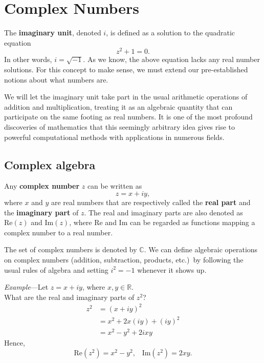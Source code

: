 \documentclass[10pt,a4paper]{article}
\begin{document}
\setcounter{page}{20}

\section{Complex Numbers}
\label{complex-numbers}

The \textbf{imaginary unit}, denoted $i$, is defined as a solution to
the quadratic equation
\begin{equation}
  z^2 + 1 = 0.
\end{equation}
In other words, $i = \sqrt{-1}$. As we know, the above equation lacks
any real number solutions. For this concept to make sense, we must
extend our pre-established notions about what numbers are.

We will let the imaginary unit take part in the usual arithmetic
operations of addition and multiplication, treating it as an algebraic
quantity that can participate on the same footing as real numbers. It is
one of the most profound discoveries of mathematics that this seemingly
arbitrary idea gives rise to powerful computational methods with
applications in numerous fields.

\subsection{Complex algebra}
\label{complex-algebra}

Any \textbf{complex number} $z$ can be written as
\begin{equation}
  z = x + i y,
\end{equation}
where $x$ and $y$ are real numbers that are respectively called the
\textbf{real part} and the \textbf{imaginary part} of $z$. The real
and imaginary parts are also denoted as $\mathrm{Re}(z)$ and
$\mathrm{Im}(z)$, where $\mathrm{Re}$ and $\mathrm{Im}$ can be
regarded as functions mapping a complex number to a real number.

The set of complex numbers is denoted by $\mathbb{C}$. We can define
algebraic operations on complex numbers (addition, subtraction,
products, etc.)~by following the usual rules of algebra and setting
$i^2 = -1$ whenever it shows up.

\begin{framed}\noindent
  \textit{Example}---Let $z = x + i y$, where $x, y \in
  \mathbb{R}$. \\ What are the real and imaginary parts of $z^2$?
  \begin{align}
    z^2 &= (x+iy)^2 \\
    &= x^2 + 2x(iy) + (iy)^2 \\
    &= x^2 - y^2 + 2ixy
  \end{align}
  Hence,
  \begin{equation}
    \mathrm{Re}(z^2) = x^2 -y^2, \;\;\; \mathrm{Im}(z^2) = 2xy.
  \end{equation}
\end{framed}
\end{document}
